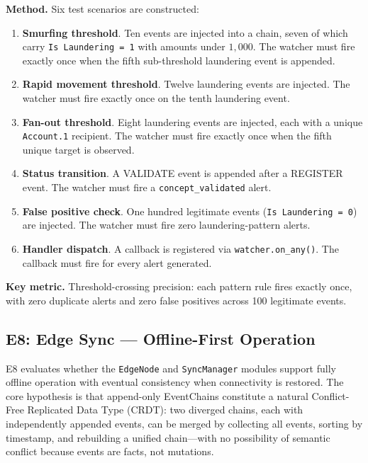\textbf{Method.} Six test scenarios are constructed:

\begin{enumerate}
\def\labelenumi{\arabic{enumi}.}
\tightlist
\item
  \textbf{Smurfing threshold}. Ten events are injected into a chain, seven of which carry \texttt{Is\ Laundering\ =\ 1} with amounts under $1,000$. The watcher must fire exactly once when the fifth sub-threshold laundering event is appended.
\item
  \textbf{Rapid movement threshold}. Twelve laundering events are injected. The watcher must fire exactly once on the tenth laundering event.
\item
  \textbf{Fan-out threshold}. Eight laundering events are injected, each with a unique \texttt{Account.1} recipient. The watcher must fire exactly once when the fifth unique target is observed.
\item
  \textbf{Status transition}. A VALIDATE event is appended after a REGISTER event. The watcher must fire a \texttt{concept\_validated} alert.
\item
  \textbf{False positive check}. One hundred legitimate events (\texttt{Is\ Laundering\ =\ 0}) are injected. The watcher must fire zero laundering-pattern alerts.
\item
  \textbf{Handler dispatch}. A callback is registered via \texttt{watcher.on\_any()}. The callback must fire for every alert generated.
\end{enumerate}

\textbf{Key metric.} Threshold-crossing precision: each pattern rule fires exactly once, with zero duplicate alerts and zero false positives across 100 legitimate events.

\subsection{E8: Edge Sync --- Offline-First Operation}\label{e8-edge-sync-offline-first-operation}

E8 evaluates whether the \texttt{EdgeNode} and \texttt{SyncManager} modules support fully offline operation with eventual consistency when connectivity is restored. The core hypothesis is that append-only EventChains constitute a natural Conflict-Free Replicated Data Type (CRDT): two diverged chains, each with independently appended events, can be merged by collecting all events, sorting by timestamp, and rebuilding a unified chain---with no possibility of semantic conflict because events are facts, not mutations.

